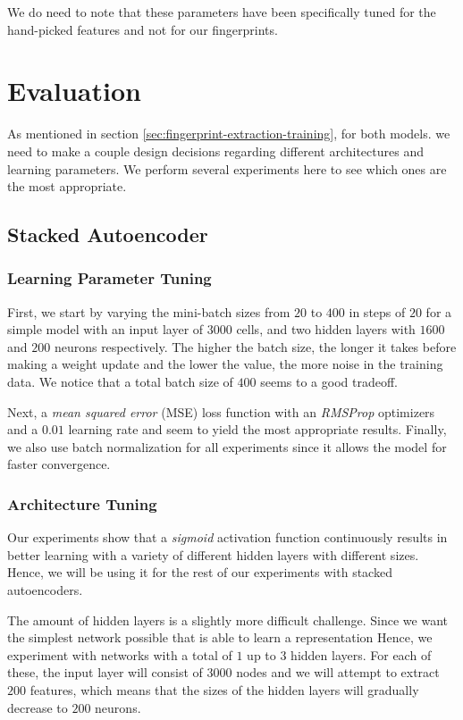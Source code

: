 We do need to note that these parameters have been specifically tuned for the hand-picked features and not for our fingerprints.

\section{Evaluation}
As mentioned in section \ref{sec:fingerprint-extraction-training}, for both models. we need to make a couple design decisions regarding different architectures and learning parameters.
We perform several experiments here to see which ones are the most appropriate.

\subsection{Stacked Autoencoder}

\subsubsection{Learning Parameter Tuning}

First, we start by varying the mini-batch sizes from $20$ to $400$ in steps of $20$ for a simple model with an input layer of $3000$ cells, and two hidden layers with $1600$ and $200$ neurons respectively.
The higher the batch size, the longer it takes before making a weight update and the lower the value, the more noise in the training data.
We notice that a total batch size of $400$ seems to a good tradeoff.

Next, a \textit{mean squared error} (MSE) loss function with an \textit{RMSProp} optimizers and a $0.01$ learning rate and seem to yield the most appropriate results.
Finally, we also use batch normalization for all experiments since it allows the model for faster convergence.

\subsubsection{Architecture Tuning}

Our experiments show that a \textit{sigmoid} activation function continuously results in better learning with a variety of different hidden layers with different sizes.
Hence, we will be using it for the rest of our experiments with stacked autoencoders.

The amount of hidden layers is a slightly more difficult challenge.
Since we want the simplest network possible that is able to learn a representation
Hence, we experiment with networks with a total of $1$ up to $3$ hidden layers.
For each of these, the input layer will consist of $3000$ nodes and we will attempt to extract $200$ features, which means that the sizes of the hidden layers will gradually decrease to $200$ neurons.

